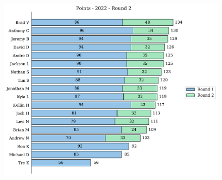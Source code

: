 \documentclass[10pt]{article}
\begin{document}
\begin{minipage}[t]{13cm}
    \begin{figure}[H]
        \vspace{-3.5cm}
        \includegraphics[width=12cm]{../../figures/2022/Points-2022-Round2.pdf}
    \end{figure}
\end{minipage}
\end{document}
